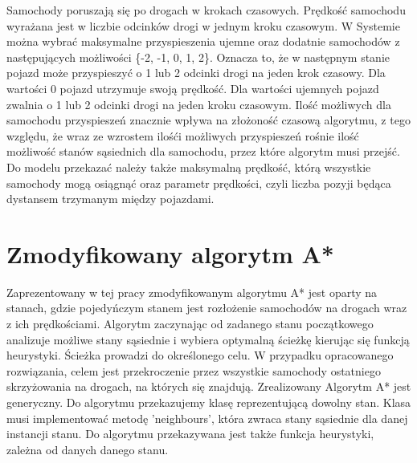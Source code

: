 \newline
Samochody poruszają się po drogach w krokach czasowych. Prędkość samochodu wyrażana jest w liczbie odcinków drogi w jednym kroku czasowym.
\newline
\newline
W Systemie można wybrać maksymalne przyspieszenia ujemne oraz dodatnie samochodów z następujących możliwości \{-2, -1, 0, 1, 2\}. Oznacza to, że w następnym stanie pojazd może przyspieszyć o 1 lub 2 odcinki drogi na jeden krok czasowy. Dla wartości 0 pojazd utrzymuje swoją prędkość. Dla wartości ujemnych pojazd zwalnia o 1 lub 2 odcinki drogi na jeden kroku czasowym. Ilość możliwych dla samochodu przyspieszeń znacznie wpływa na złożoność czasową algorytmu, z tego względu, że wraz ze wzrostem ilośći możliwych przyspieszeń rośnie ilość możliwość stanów sąsiednich dla samochodu, przez które algorytm musi przejść.        
\newline
\newline
Do modelu przekazać należy także maksymalną prędkość, którą wszystkie samochody mogą osiągnąć oraz parametr prędkości, czyli liczba pozyji będąca dystansem trzymanym między pojazdami.

\section{Zmodyfikowany algorytm A*}

Zaprezentowany w tej pracy zmodyfikowanym algorytmu A* jest oparty na stanach, gdzie pojedyńczym stanem jest rozłożenie samochodów na drogach wraz z ich prędkościami.
\newline
\newline
Algorytm zaczynając od zadanego stanu początkowego analizuje możliwe stany sąsiednie i wybiera optymalną ścieżkę kierując się funkcją heurystyki. Ścieżka prowadzi do określonego celu.
\newline
\newline
W przypadku opracowanego rozwiązania, celem jest przekroczenie przez wszystkie samochody ostatniego skrzyżowania na drogach, na których się znajdują.
\newline
\newline
Zrealizowany Algorytm A* jest generyczny. Do algorytmu przekazujemy klasę reprezentującą dowolny stan. Klasa musi implementować metodę 'neighbours', która zwraca stany sąsiednie dla danej instancji stanu.
\newline
\newline
Do algorytmu przekazywana jest także funkcja heurystyki, zależna od danych danego stanu.

